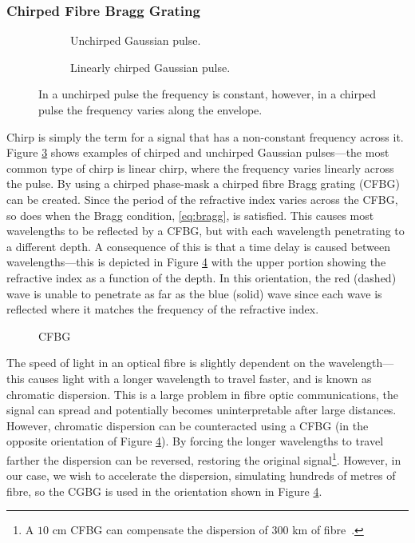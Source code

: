 \subsubsection{Chirped Fibre Bragg Grating}
\begin{figure}[tbp]
\begin{subfigure}{0.5\textwidth}

\caption{Unchirped Gaussian pulse.}
\label{fig:unchirped}
\end{subfigure}
\begin{subfigure}{0.5\textwidth}

\caption{Linearly chirped Gaussian pulse.}
\label{fig:chirped}
\end{subfigure}
\caption{In a unchirped pulse the frequency is constant, however, in a chirped pulse the frequency varies along the envelope.}
\label{fig:chirp}
\end{figure}

Chirp is simply the term for a signal that has a non-constant frequency across it. Figure \ref{fig:chirp} shows examples of chirped and unchirped Gaussian pulses---the most common type of chirp is linear chirp, where the frequency varies linearly across the pulse. By using a chirped phase-mask a chirped fibre Bragg grating (CFBG) can be created. Since the period of the refractive index varies across the CFBG, so does when the Bragg condition, \eqref{eq:bragg}, is satisfied. This causes most wavelengths to be reflected by a CFBG, but with each wavelength penetrating to a different depth. A consequence of this is that a time delay is caused between wavelengths---this is depicted in Figure \ref{fig:cfbg} with the upper portion showing  the refractive index as a function of the depth. In this orientation, the red (dashed) wave is unable to penetrate as far as the blue (solid) wave since each wave is reflected where it matches the frequency of the refractive index.  \\

\begin{figure}[tbp]
\centering

\caption[CFBG]{CFBG}
\label{fig:cfbg}
\end{figure}

The speed of light in an optical fibre is slightly dependent on the wavelength---this causes light with a longer wavelength to travel faster, and is known as chromatic dispersion. This is a large problem in fibre optic communications, the signal can spread and potentially becomes uninterpretable after large distances. However, chromatic dispersion can be counteracted using a CFBG \cite{agrawal2002, alazzawi, starodoumov} (in the opposite orientation of Figure \ref{fig:cfbg}). By forcing the longer wavelengths to travel farther the dispersion can be reversed, restoring the original signal\footnote{A $10$ cm CFBG can compensate the dispersion of $300$ km of fibre~\cite{agrawal2002}.}. However, in our case, we wish to accelerate the dispersion, simulating hundreds of metres of fibre, so the CGBG is used in the orientation shown in Figure \ref{fig:cfbg}. \\

